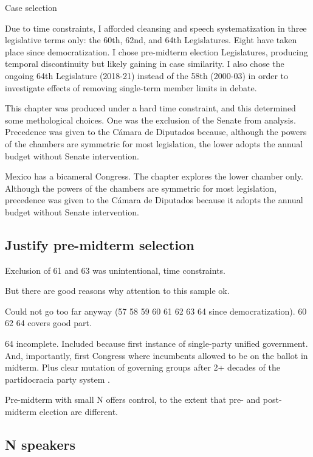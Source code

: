 \documentclass[letter,12pt]{article}
\begin{document}
Case selection

Due to time constraints, I afforded cleansing and speech systematization in three legislative terms only: the 60th, 62nd, and 64th Legislatures. Eight have taken place since democratization. I chose pre-midterm election Legislatures, producing temporal discontinuity but likely gaining in case similarity. I also chose the ongoing 64th Legislature (2018-21) instead of the 58th (2000-03) in order to investigate effects of removing single-term member limits in debate. 

This chapter was produced under a hard time constraint, and this determined some methological choices. One was the exclusion of the Senate from analysis. Precedence was given to the Cámara de Diputados because, although the powers of the chambers are symmetric for most legislation, the lower adopts the annual budget without Senate intervention. 

Mexico has a bicameral Congress. The chapter explores the lower chamber only. Although the powers of the chambers are symmetric for most legislation, precedence was given to the Cámara de Diputados because it adopts the annual budget without Senate intervention. 



\subsection{Justify pre-midterm selection}

Exclusion of 61 and 63 was unintentional, time constraints.

But there are good reasons why attention to this sample ok.

Could not go too far anyway (57 58 59 60 61 62 63 64 since democratization). 60 62 64 covers good part.

64 incomplete. Included because first instance of single-party unified government. And, importantly, first Congress where incumbents allowed to be on the ballot in midterm. Plus clear mutation of governing groups after 2+ decades of the partidocracia party system \citep{magar.2007ref.2015,magar.estevez.rosas.2010}. 

Pre-midterm with small N offers control, to the extent that pre- and post-midterm election are different.





\subsection{N speakers}
\end{document}
